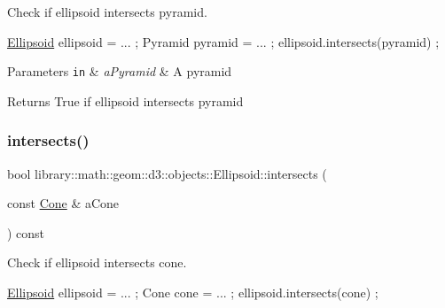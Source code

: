 Check if ellipsoid intersects pyramid. 


\begin{DoxyCode}
\hyperlink{classlibrary_1_1math_1_1geom_1_1d3_1_1objects_1_1_ellipsoid_aae81fe0edc7f0e8d4590ea89ae73cb14}{Ellipsoid} ellipsoid = ... ;
Pyramid pyramid = ... ;
ellipsoid.intersects(pyramid) ;
\end{DoxyCode}



\begin{DoxyParams}[1]{Parameters}
\mbox{\tt in}  & {\em a\+Pyramid} & A pyramid \\
\hline
\end{DoxyParams}
\begin{DoxyReturn}{Returns}
True if ellipsoid intersects pyramid 
\end{DoxyReturn}
\mbox{\label{classlibrary_1_1math_1_1geom_1_1d3_1_1objects_1_1_ellipsoid_ab48166cd354dbcbc667a11cf6ef19593}} 
\subsubsection{\texorpdfstring{intersects()}{intersects()}\hspace{0.1cm}{\footnotesize\ttfamily [10/10]}}
{\footnotesize\ttfamily bool library\+::math\+::geom\+::d3\+::objects\+::\+Ellipsoid\+::intersects (\begin{DoxyParamCaption}\item[{const \hyperlink{classlibrary_1_1math_1_1geom_1_1d3_1_1objects_1_1_cone}{Cone} \&}]{a\+Cone }\end{DoxyParamCaption}) const}



Check if ellipsoid intersects cone. 


\begin{DoxyCode}
\hyperlink{classlibrary_1_1math_1_1geom_1_1d3_1_1objects_1_1_ellipsoid_aae81fe0edc7f0e8d4590ea89ae73cb14}{Ellipsoid} ellipsoid = ... ;
Cone cone = ... ;
ellipsoid.intersects(cone) ;
\end{DoxyCode}



